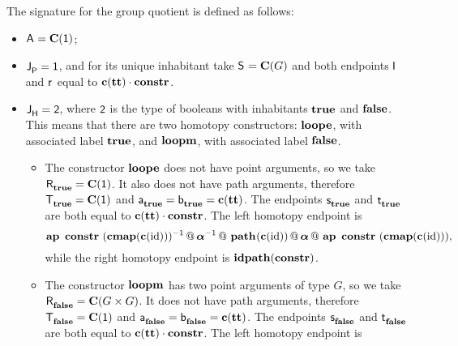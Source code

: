 The signature for the group quotient is defined as follows:
\begin{itemize}
\item $\pointconstr = \constantP{\unit}$;
\item $\pathlabel = \unit$, and for its unique inhabitant take $\patharg = \constantP{G}$ and both endpoints $\pathleft$ and $\pathright$ equal to $\comp{\Ce(\unitt)}{\constr}$.
\item $\homotlabel = \bool$, where $\bool$ is the type of
booleans with inhabitants $\booltrue$ and $\boolfalse$. This means
that there are two homotopy constructors: $\groupquotloope$, with
associated label $\booltrue$, and $\groupquotloopm$, with associated
label $\boolfalse$.
\begin{itemize}
\item The constructor $\groupquotloope$ does not have
point arguments, so we take $\homotpointarg_{\booltrue}
= \constantP{\unit}$. It also does not have path arguments, therefore
$\homotpathtarg_{\booltrue} = \constantP{\unit}$ and
$\pathargleft_{\booltrue} = \pathargright_{\booltrue} = \Ce(\unitt)$.
The endpoints $\homotpathleft_{\booltrue}$ and
$\homotpathright_{\booltrue}$ are both equal to
$\comp{\Ce(\unitt)}{\constr}$. The left homotopy endpoint is
\[
\hconcat{\hap{\constr}{\hinv{(\hcompconst{\Ce(\id)})}}}{
\hconcat{\hinv{\hassocN}}{
\hconcat{\hconstr{}{\Ce(\id)}}{
\hconcat{\hassocN}{\hap{\constr}{(\hcompconst{\Ce(\id)})}}
}}},
\]
while the right homotopy endpoint is $\hrefl{\constr}$.
\item The constructor $\groupquotloopm$ has two point
arguments of type $G$, so we take $\homotpointarg_{\boolfalse}
= \constantP{G \times G}$. It does not have path arguments, therefore
$\homotpathtarg_{\boolfalse} = \constantP{\unit}$ and
$\pathargleft_{\boolfalse} = \pathargright_{\boolfalse}
= \Ce(\unitt)$.  The endpoints $\homotpathleft_{\boolfalse}$ and
$\homotpathright_{\boolfalse}$ are both equal to
$\comp{\Ce(\unitt)}{\constr}$. The left homotopy endpoint is

\end{itemize}
\end{itemize}
